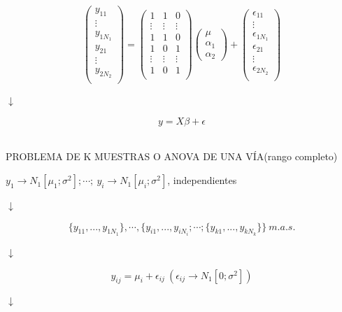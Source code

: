 \documentclass[10pt,a4paper]{book}
\begin{document}
$$ \left( \begin{array}{c}
y_{11}\\
\vdots\\
y_{1N_1}\\
\hline
y_{21}\\
\vdots\\
y_{2N_2}\\
\end{array} \right) =  
\left( \begin{array}{ccc}
1 & 1 & 0\\
\vdots & \vdots & \vdots\\
1 & 1 & 0\\
\hline
1 & 0 & 1\\
\vdots & \vdots & \vdots\\
1 & 0 & 1\\
\end{array} \right)
\left( \begin{array}{c}
\mu\\
\alpha_1\\
\alpha_2 \end{array} \right) + 
\left( \begin{array}{c}
\epsilon_{11}\\
\vdots\\
\epsilon_{1N_1}\\
\hline
\epsilon_{21}\\
\vdots\\
\epsilon_{2N_2}\\
\end{array} \right)$$
\begin{center}
$ \downarrow $
\end{center}
$$y=X\beta+\epsilon$$
\ \\
\begin{center}
PROBLEMA DE K MUESTRAS O ANOVA DE UNA VÍA(rango completo)
\end{center}
\begin{center}
$y_1 \rightarrow N_1[\mu_1;\sigma^2];\cdots;\ y_i \rightarrow N_1[\mu_i;\sigma^2]$, independientes
\end{center}
\begin{center}
$ \downarrow $
\end{center}
$$\{y_{11},...,y_{1N_1}\},\cdots,\{y_{i1},...,y_{iN_i};\cdots;\{y_{k1},...,y_{kN_k}\}\}\ m.a.s.$$
\begin{center}
$ \downarrow $
\end{center}
$$y_{ij}=\mu_i + \epsilon_{ij}\  (\epsilon_{ij} \rightarrow N_1[0;\sigma^2])$$
\begin{center}
$ \downarrow $
\end{center}
\end{document}
